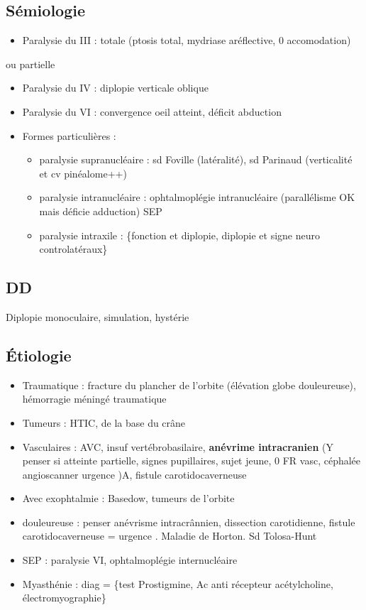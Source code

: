 \documentclass[11pt]{article}
\begin{document}
\subsection{Sémiologie}
\label{sec:orgdbfe53e}
\begin{itemize}
\item Paralysie du III : totale (ptosis total, mydriase aréflective, 0 accomodation)
\end{itemize}
ou partielle
\begin{itemize}
\item Paralysie du IV : diplopie verticale oblique
\item Paralysie du VI : convergence oeil atteint, déficit abduction
\item Formes particulières :
\begin{itemize}
\item paralysie supranucléaire : sd Foville (latéralité), sd Parinaud (verticalité
et cv \thus pinéalome++)
\item paralysie intranucléaire : ophtalmoplégie intranucléaire (parallélisme OK mais
déficie adduction) \thus SEP
\item paralysie intraxile : \{fonction et diplopie, diplopie et signe neuro
controlatéraux\}
\end{itemize}
\end{itemize}

\subsection{DD}
\label{sec:org555315c}
Diplopie monoculaire, simulation, hystérie

\subsection{Étiologie}
\label{sec:org31dd2b4}
\begin{itemize}
\item Traumatique : fracture du plancher de l'orbite (élévation globe douleureuse),
hémorragie méningé traumatique
\item Tumeurs : HTIC, de la base du crâne
\item Vasculaires : AVC, insuf vertébrobasilaire, \textbf{anévrime
intracranien} (Y penser si atteinte partielle, signes
pupillaires, sujet jeune, 0 FR vasc, céphalée \thus angioscanner urgence
\skull)A, fistule carotidocaverneuse
\item Avec exophtalmie : Basedow, tumeurs de l'orbite
\item douleureuse : penser anévrisme intracrânnien, dissection carotidienne, fistule
carotidocaverneuse = urgence \skull. Maladie de Horton. Sd Tolosa-Hunt
\item SEP : paralysie VI, ophtalmoplégie internucléaire
\item Myasthénie : diag = \{test Prostigmine, Ac anti récepteur acétylcholine, électromyographie\}
\end{itemize}
\end{document}

